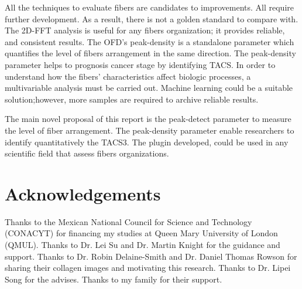 \documentclass[12pt,a4paper]{article}
\begin{document}
All the techniques to evaluate fibers are candidates to improvements. All require further development. As a result, there is not a golden standard to compare with. The 2D-FFT analysis is useful for any fibers organization; it provides reliable, and consistent results. The OFD's peak-density is a standalone parameter which quantifies the level of fibers arrangement in the same direction.  The peak-density parameter helps to prognosis cancer stage by identifying TACS. In order to understand how the fibers' characteristics affect biologic processes, a multivariable analysis must be carried out. Machine learning could be a suitable solution;however, more samples are required to archive reliable results.

The main novel proposal of this report is the peak-detect parameter to measure the level of fiber arrangement. The peak-density parameter enable researchers to identify quantitatively the TACS3. The plugin developed, could be used in any scientific field that assess fibers organizations.

\section{Acknowledgements}

Thanks to the Mexican National Council for Science and Technology (CONACYT) for financing my studies at Queen Mary University of London (QMUL). Thanks to Dr. Lei Su and Dr. Martin Knight for the guidance and support. Thanks to Dr. Robin Delaine-Smith and Dr. Daniel Thomas Rowson for sharing their collagen images and motivating this research. Thanks to Dr. Lipei Song for the advises. Thanks to my family for their support.      
\end{document}
